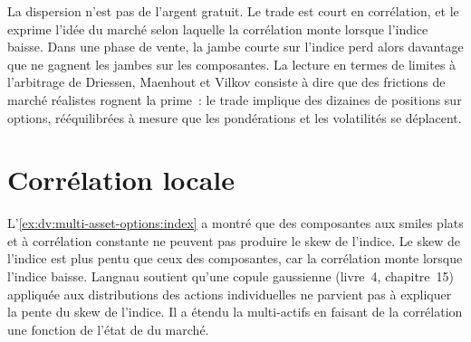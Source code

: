 \begin{omfigure}

\label{fig:dv:multi-asset-options:dispersion}
\end{omfigure}

La dispersion n'est pas de l'argent gratuit. Le trade est court en corrélation, et le  exprime l'idée du marché selon laquelle
la corrélation monte lorsque l'indice baisse. Dans une phase de vente, la jambe courte sur l'indice perd alors davantage que ne gagnent les jambes sur les composantes. La lecture en termes de limites à l'arbitrage de
Driessen, Maenhout et Vilkov consiste à dire que des frictions de marché réalistes rognent la prime~: le trade implique des dizaines de positions sur
options, rééquilibrées à mesure que les pondérations et les volatilités se déplacent.

\section{Corrélation locale}

L'\cref{ex:dv:multi-asset-options:index} a montré que des composantes aux smiles plats et à corrélation constante ne peuvent pas produire le
skew de l'indice. Le skew de l'indice est plus pentu que ceux des composantes, car la corrélation monte lorsque l'indice baisse. Langnau
soutient qu'une copule gaussienne (livre~4, chapitre~15) appliquée aux distributions des actions individuelles ne parvient pas à expliquer la
pente du skew de l'indice. Il a étendu la  multi-actifs en faisant de la corrélation une fonction de l'état de
du marché.

